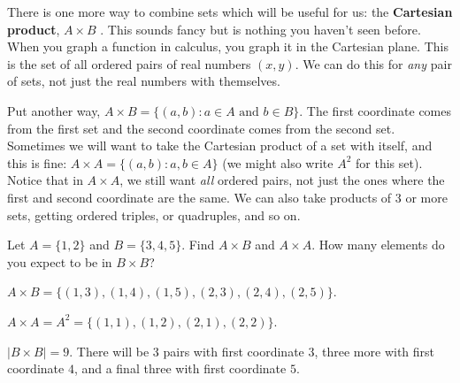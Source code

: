\documentclass[11pt,]{book}
\newcommand{\terminology}[1]{\textbf{#1}}
\theoremstyle{ptxplainnotitle}
\theoremstyle{ptxplaintitle}
\theoremstyle{ptxdefinitionnotitle}
\theoremstyle{ptxdefinitiontitle}
\theoremstyle{ptxdefinitionnotitle}
\theoremstyle{ptxdefinitiontitle}
\theoremstyle{ptxdefinitionnotitle}
\theoremstyle{ptxdefinitiontitle}
\theoremstyle{ptxdefinitiontitlenonumber}
\theoremstyle{ptxdefinitiontitlenonumber}
\numberwithin{equation}{chapter}
\newcommand{\st}{:}
\begin{document}
\hypertarget{p-756}{}%
There is one more way to combine sets which will be useful for us: the \terminology{Cartesian product}, \(A \times B\)\label{notation-25}
. This sounds fancy but is nothing you haven't seen before. When you graph a function in calculus, you graph it in the Cartesian plane. This is the set of all ordered pairs of real numbers \((x,y)\). We can do this for \emph{any} pair of sets, not just the real numbers with themselves.%
\par
\hypertarget{p-757}{}%
Put another way, \(A \times B = \{(a,b) \st a \in A \text{ and } b \in B\}\). The first coordinate comes from the first set and the second coordinate comes from the second set. Sometimes we will want to take the Cartesian product of a set with itself, and this is fine: \(A \times A = \{(a,b) \st a, b \in A\}\) (we might also write \(A^2\) for this set). Notice that in \(A \times A\), we still want \emph{all} ordered pairs, not just the ones where the first and second coordinate are the same. We can also take products of 3 or more sets, getting ordered triples, or quadruples, and so on.%
\begin{example}\label{example-33}
\hypertarget{p-758}{}%
Let \(A = \{1,2\}\) and \(B = \{3,4,5\}\). Find \(A \times B\) and \(A \times A\). How many elements do you expect to be in \(B \times B\)?%
\par\smallskip%
\noindent\textbf{}\hypertarget{solution-108}{}\hypertarget{p-759}{}%
\(A \times B = \{(1,3), (1,4), (1,5), (2,3), (2,4), (2,5)\}\).%
\par
\hypertarget{p-760}{}%
\(A \times A = A^2 = \{(1,1), (1,2), (2,1), (2,2)\}\).%
\par
\hypertarget{p-761}{}%
\(|B\times B| = 9\). There will be 3 pairs with first coordinate \(3\), three more with first coordinate \(4\), and a final three with first coordinate \(5\).%
\end{example}
\typeout{************************************************}
\typeout{************************************************}
\end{document}
